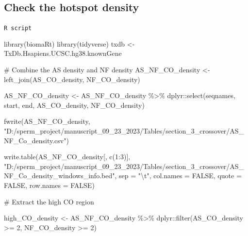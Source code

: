 \documentclass[
  letterpaper,
  DIV=11,
  numbers=noendperiod]{scrreprt}
\newenvironment{Shaded}{\begin{snugshade}}{\end{snugshade}}
\newcommand{\AttributeTok}[1]{\textcolor[rgb]{0.40,0.45,0.13}{#1}}
\newcommand{\CommentTok}[1]{\textcolor[rgb]{0.37,0.37,0.37}{#1}}
\newcommand{\ConstantTok}[1]{\textcolor[rgb]{0.56,0.35,0.01}{#1}}
\newcommand{\DecValTok}[1]{\textcolor[rgb]{0.68,0.00,0.00}{#1}}
\newcommand{\FunctionTok}[1]{\textcolor[rgb]{0.28,0.35,0.67}{#1}}
\newcommand{\NormalTok}[1]{\textcolor[rgb]{0.00,0.23,0.31}{#1}}
\newcommand{\OtherTok}[1]{\textcolor[rgb]{0.00,0.23,0.31}{#1}}
\newcommand{\SpecialCharTok}[1]{\textcolor[rgb]{0.37,0.37,0.37}{#1}}
\newcommand{\StringTok}[1]{\textcolor[rgb]{0.13,0.47,0.30}{#1}}
\begin{document}
\hypertarget{check-the-hotspot-density}{%
\subsection{Check the hotspot density}\label{check-the-hotspot-density}}

\begin{codelisting}

\caption{\texttt{R script}}

\begin{Shaded}
\begin{Highlighting}[]
\FunctionTok{library}\NormalTok{(biomaRt)}
\FunctionTok{library}\NormalTok{(tidyverse)}
\NormalTok{txdb }\OtherTok{\textless{}{-}}\NormalTok{ TxDb.Hsapiens.UCSC.hg38.knownGene}

\CommentTok{\# Combine the AS density and NF density }
\NormalTok{AS\_NF\_CO\_density }\OtherTok{\textless{}{-}} \FunctionTok{left\_join}\NormalTok{(AS\_CO\_density, NF\_CO\_density)}

\NormalTok{AS\_NF\_CO\_density }\OtherTok{\textless{}{-}}\NormalTok{ AS\_NF\_CO\_density }\SpecialCharTok{\%\textgreater{}\%}\NormalTok{ dplyr}\SpecialCharTok{::}\FunctionTok{select}\NormalTok{(seqnames, start, end, AS\_CO\_density, NF\_CO\_density)}

\FunctionTok{fwrite}\NormalTok{(AS\_NF\_CO\_density, }\StringTok{"D:/sperm\_project/manuscript\_09\_23\_2023/Tables/section\_3\_crossover/AS\_NF\_Co\_density.csv"}\NormalTok{)}

\FunctionTok{write.table}\NormalTok{(AS\_NF\_CO\_density[, }\FunctionTok{c}\NormalTok{(}\DecValTok{1}\SpecialCharTok{:}\DecValTok{3}\NormalTok{)], }\StringTok{"D:/sperm\_project/manuscript\_09\_23\_2023/Tables/section\_3\_crossover/AS\_NF\_Co\_density\_windows\_info.bed"}\NormalTok{, }\AttributeTok{sep =} \StringTok{"}\SpecialCharTok{\textbackslash{}t}\StringTok{"}\NormalTok{, }\AttributeTok{col.names =} \ConstantTok{FALSE}\NormalTok{, }\AttributeTok{quote =} \ConstantTok{FALSE}\NormalTok{, }\AttributeTok{row.names =} \ConstantTok{FALSE}\NormalTok{)}

\CommentTok{\# Extract the high CO region}

\NormalTok{high\_CO\_density }\OtherTok{\textless{}{-}}\NormalTok{ AS\_NF\_CO\_density }\SpecialCharTok{\%\textgreater{}\%}\NormalTok{ dplyr}\SpecialCharTok{::}\FunctionTok{filter}\NormalTok{(AS\_CO\_density }\SpecialCharTok{\textgreater{}=} \DecValTok{2}\NormalTok{, NF\_CO\_density }\SpecialCharTok{\textgreater{}=} \DecValTok{2}\NormalTok{)}


\end{Highlighting}
\end{Shaded}
\end{codelisting}
\end{document}
